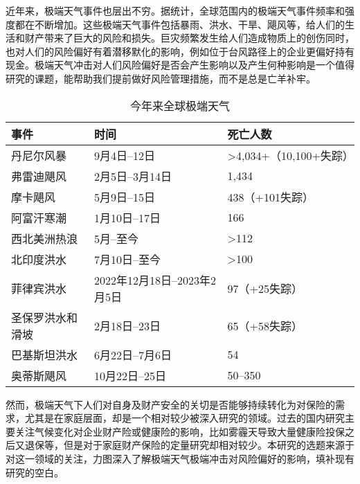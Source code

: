 近年来，极端天气事件也层出不穷。据统计，全球范围内的极端天气事件频率和强度都在不断增加。这些极端天气事件包括暴雨、洪水、干旱、飓风等，给人们的生活和财产带来了巨大的风险和损失。巨灾频繁发生给人们造成物质上的创伤同时，也对人们的风险偏好有着潜移默化的影响，例如位于台风路径上的企业更偏好持有现金\citep{杨娜娜2019自然灾害与企业现金持有}。极端天气冲击对人们风险偏好是否会产生影响以及产生何种影响是一个值得研究的课题，能帮助我们提前做好风险管理措施，而不是总是亡羊补牢。

\begin{table}[H]
    \centering
    \caption{今年来全球极端天气}
    \begin{tabular}{lll}
        \toprule
        事件       & 时间                    & 死亡人数                            \\
        \midrule
        丹尼尔风暴    & 9月4日–12日              & \textgreater{}4,034+（10,100+失踪） \\
        弗雷迪飓风    & 2月5日–3月14日            & 1,434                           \\
        摩卡飓风     & 5月9日–15日              & 438（+101失踪）                     \\
        阿富汗寒潮    & 1月10日–17日             & 166                             \\
        西北美洲热浪   & 5月–至今                 & \textgreater{}112               \\
        北印度洪水    & 7月10日–至今              & \textgreater{}100               \\
        菲律宾洪水    & 2022年12月18日–2023年2月5日 & 97（+25失踪）                       \\
        圣保罗洪水和滑坡 & 2月18日–23日             & 65（+58失踪）                       \\
        巴基斯坦洪水   & 6月22日–7月6日            & 54                              \\
        奥蒂斯飓风    & 10月22日–25日            & 50–350                          \\
        \bottomrule
    \end{tabular}
\end{table}

然而，极端天气下人们对自身及财产安全的关切是否能够持续转化为对保险的需求，尤其是在家庭层面，却是一个相对较少被深入研究的领域。过去的国内研究主要关注气候变化对企业财产险或健康险的影响，比如雾霾天导致大量健康险投保之后又退保等，但是对于家庭财产保险的定量研究却相对较少。本研究的选题来源于对这一领域的关注，力图深入了解极端天气极端冲击对风险偏好的影响，填补现有研究的空白。

